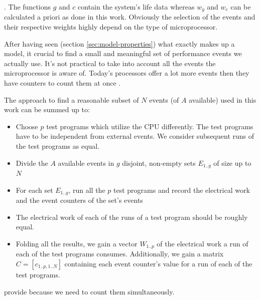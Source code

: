 . The functions $g$ and $c$ contain the system's life data whereas $w_g$ and
$w_c$ can be calculated a priori as done in this work. Obviously the selection
of the events and their respective weights highly depend on the type of
microprocessor.


\label{sec:min-events}

After having seen (section \ref{sec:model-properties}) what exactly makes up a
model, it crucial to find a small and meaningful set of performance events we
actually use. It's not practical to take into account all the events the
microprocessor is aware of. Today's processors offer a lot more events then they
have counters to count them at once \cite{intel2011softdev1}.

The approach to find a reasonable subset of $N$ events (of $A$ available) used
in this work can be summed up to:

\begin{itemize}

\item Choose $p$ test programs which utilize the CPU differently. The test
programs have to be independent from external events. We consider subsequent
runs of the test programs as equal.

\item Divide the $A$ available events in $g$ disjoint, non-empty sets $E_{1..g}$
of size up to $N$

\item For each set $E_{1..g}$, run all the $p$ test programs and record the
electrical work and the event counters of the set's events

\item The electrical work of each of the runs of a test program should be
roughly equal.

\item Folding all the results, we gain a vector $W_{1..p}$ of the electrical
work a run of each of the test programs consumes. Additionally, we gain a matrix
$C = [c_{1..p,1..N}]$ containing each event counter's value for a run of each of
the test programs.

\end{itemize}

provide because we need to count them simultaneously.

